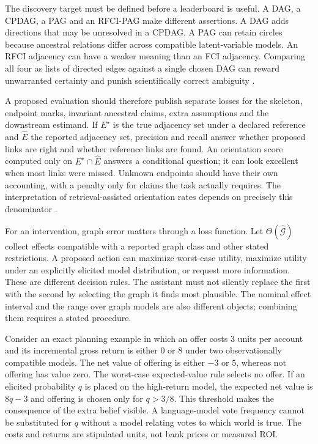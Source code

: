 The discovery target must be defined before a leaderboard is useful. A DAG,
a CPDAG, a PAG and an RFCI-PAG make different assertions. A DAG adds directions
that may be unresolved in a CPDAG. A PAG can retain circles because ancestral
relations differ across compatible latent-variable models. An RFCI adjacency
can have a weaker meaning than an FCI adjacency. Comparing all four as lists of
directed edges against a single chosen DAG can reward unwarranted certainty
and punish scientifically correct ambiguity
\citep{exec13_latentr_colombo2012,exec13_latentr_primary}.

A proposed evaluation should therefore publish separate losses for the
skeleton, endpoint marks, invariant ancestral claims, extra assumptions and the
downstream estimand. If $E^\star$ is the true adjacency set under a declared
reference and $\widehat E$ the reported adjacency set, precision and recall
answer whether proposed links are right and whether reference links are found.
An orientation score computed only on $E^\star\cap\widehat E$ answers a
conditional question; it can look excellent when most links were missed.
Unknown endpoints should have their own accounting, with a penalty only for
claims the task actually requires. The interpretation of retrieval-assisted
orientation rates depends on precisely this denominator
\citep{v12_la_2402_15301}.

For an intervention, graph error matters through a loss function. Let
$\Theta(\widehat{\mathcal G})$ collect effects compatible with a reported graph
class and other stated restrictions. A proposed action can maximize worst-case
utility, maximize utility under an explicitly elicited model distribution, or
request more information. These are different decision rules. The assistant
must not silently replace the first with the second by selecting the graph it
finds most plausible. The nominal effect interval and the range over graph
models are also different objects; combining them requires a stated procedure.

Consider an exact planning example in which an offer costs 3 units per account
and its incremental gross return is either 0 or 8 under two observationally
compatible models. The net value of offering is either $-3$ or $5$, whereas
not offering has value zero. The worst-case expected-value rule selects no
offer. If an elicited probability $q$ is placed on the high-return model, the
expected net value is $8q-3$ and offering is chosen only for $q>3/8$. This
threshold makes the consequence of the extra belief visible. A language-model
vote frequency cannot be substituted for $q$ without a model relating votes to
which world is true. The costs and returns are stipulated units, not bank
prices or measured ROI.

